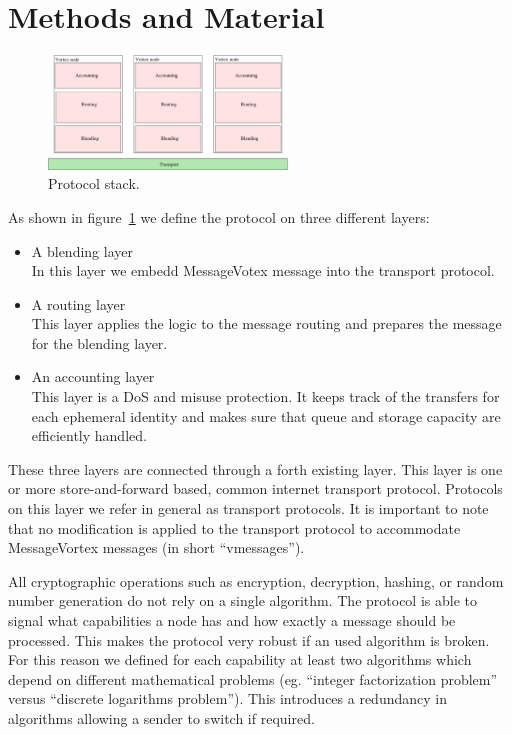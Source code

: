 \documentclass[9pt,journal,compsoc]{IEEEtran}
\begin{document}
\section{Methods and Material}

\begin{figure}[!t]
\centering
\includegraphics[width=2.5in]{../inc/roughProtocolDesign}
\caption{Protocol stack.}
\label{fig:layers}
\end{figure}
As shown in figure~\ref{fig:layers} we define the protocol on three different layers:
\begin{itemize}
	\item A blending layer\\
	      In this layer we embedd MessageVotex message into the transport protocol. 
	\item A routing layer\\
	      This layer applies the logic to the message routing and prepares the message for the blending layer.
	\item An accounting layer\\
	      This layer is a DoS and misuse protection. It keeps track of the transfers for each ephemeral identity and makes sure that queue and storage capacity are efficiently handled.     
\end{itemize}
These three layers are connected through a forth existing layer. This layer is one or more store-and-forward based, common internet transport protocol. Protocols on this layer we refer in general as transport protocols. It is important to note that no modification is applied to the transport protocol to accommodate MessageVortex messages (in short ``vmessages'').

All cryptographic operations such as encryption, decryption, hashing, or random number generation do not rely on a single algorithm. The protocol is able to signal what capabilities a node has and how exactly a message should be processed. This makes the protocol very robust if an used algorithm is broken. For this reason we defined for each capability at least two algorithms which depend on different mathematical problems (eg. ``integer factorization problem'' versus ``discrete logarithms problem''). This introduces a redundancy in algorithms allowing a sender to switch if required.
\end{document}
